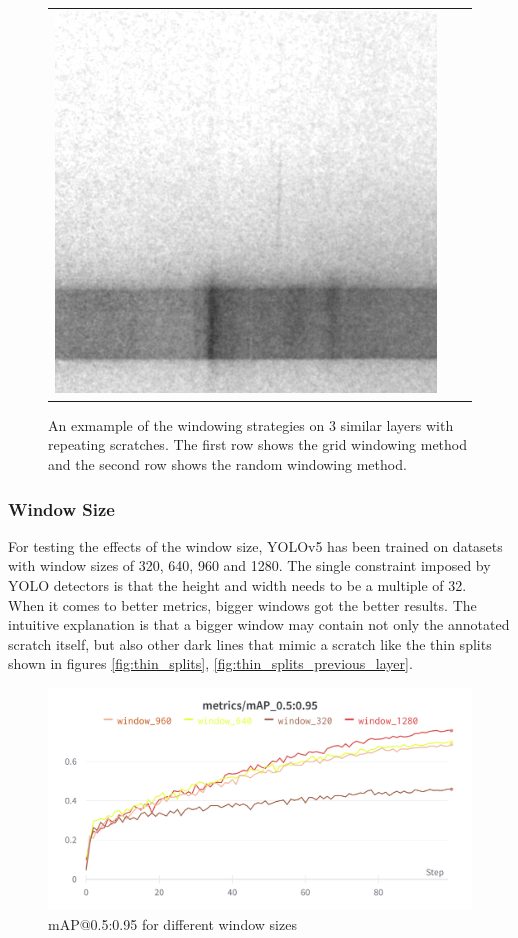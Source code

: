 \begin{figure}
\begin{center}
\begin{tabular}{ c c c }
  \includegraphics[width=.3\linewidth]{images/win_strategy/layer_23_rand} \\
  \end{tabular}
  \end{center}

  \caption{An exmample of the windowing strategies on 3 similar layers with repeating scratches. The first row shows the grid windowing method and the second row shows the random windowing method.}
  \label{fig:win_strategy}
\end{figure}

\subsubsection{Window Size}
For testing the effects of the window size, YOLOv5 has been trained on datasets with window sizes of 320, 640, 960 and 1280. The single constraint imposed by YOLO detectors is that the height and width needs to be a multiple of 32. \\
When it comes to better metrics, bigger windows got the better results. The intuitive explanation is that a bigger window may contain not only the annotated scratch itself, but also other dark lines that mimic a scratch like the thin splits shown in figures \ref{fig:thin_splits}, \ref{fig:thin_splits_previous_layer}.\\

\begin{figure}
\includegraphics[width=\textwidth]{images/map_win_size}
\caption{mAP@0.5:0.95 for different window sizes}
\end{figure}

